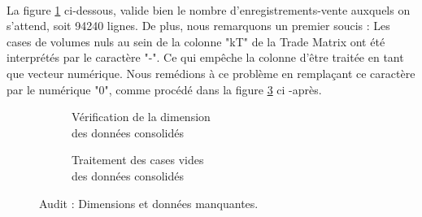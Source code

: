 \paragraph{}
		La figure \ref{fig:size} ci-dessous, valide bien le nombre d'enregistrements-vente auxquels on s'attend, soit 94240 lignes. De plus, nous remarquons un premier soucis : Les cases de volumes nuls au sein de la colonne "kT" de la Trade Matrix ont été interprétés par le caractère "-". Ce qui empêche la colonne d'être traitée en tant que vecteur numérique. Nous remédions à ce problème en remplaçant ce caractère par le numérique "0", comme procédé dans la figure \ref{fig:nas} ci -après.
		\newline
			\begin{figure}[H]
			\begin{subfigure}{.5\textwidth}
				\centering
				\caption{Vérification de la dimension\\des données consolidés}
				\label{fig:size}
			\end{subfigure}
			\begin{subfigure}{.5\textwidth}
					\centering
					\caption{Traitement des cases vides\\des données consolidés}
					\label{fig:nas}
			\end{subfigure}
			\caption{Audit : Dimensions et données manquantes.}
				\end{figure}
				

